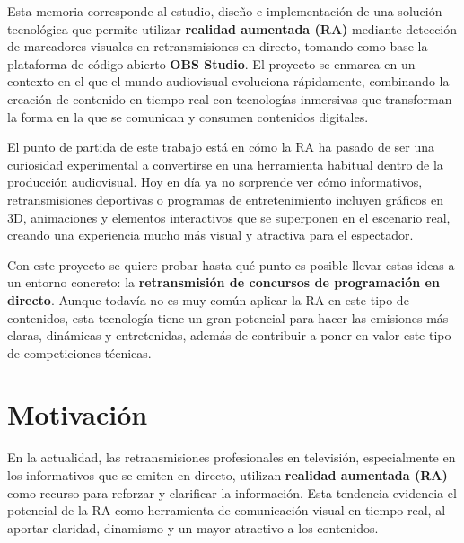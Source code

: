 

Esta memoria corresponde al estudio, diseño e implementación de una solución tecnológica que permite utilizar \textbf{realidad aumentada (RA)} mediante detección de marcadores visuales en retransmisiones en directo, tomando como base la plataforma de código abierto \textbf{OBS Studio}. El proyecto se enmarca en un contexto en el que el mundo audiovisual evoluciona rápidamente, combinando la creación de contenido en tiempo real con tecnologías inmersivas que transforman la forma en la que se comunican y consumen contenidos digitales.

El punto de partida de este trabajo está en cómo la RA ha pasado de ser una curiosidad experimental a convertirse en una herramienta habitual dentro de la producción audiovisual. Hoy en día ya no sorprende ver cómo informativos, retransmisiones deportivas o programas de entretenimiento incluyen gráficos en 3D, animaciones y elementos interactivos que se superponen en el escenario real, creando una experiencia mucho más visual y atractiva para el espectador.

Con este proyecto se quiere probar hasta qué punto es posible llevar estas ideas a un entorno concreto: la \textbf{retransmisión de concursos de programación en directo}. Aunque todavía no es muy común aplicar la RA en este tipo de contenidos, esta tecnología tiene un gran potencial para hacer las emisiones más claras, dinámicas y entretenidas, además de contribuir a poner en valor este tipo de competiciones técnicas.


\section{Motivación}

En la actualidad, las retransmisiones profesionales en televisión, especialmente en los informativos que se emiten en directo, utilizan \textbf{realidad aumentada (RA)} como recurso para reforzar y clarificar la información. Esta tendencia evidencia el potencial de la RA como herramienta de comunicación visual en tiempo real, al aportar claridad, dinamismo y un mayor atractivo a los contenidos.

